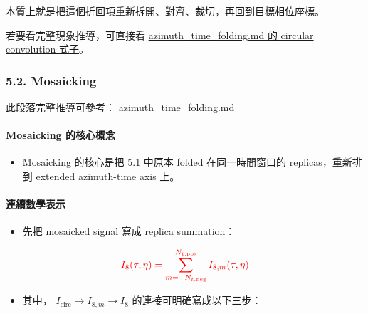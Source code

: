 \documentclass[10pt]{article}
\providecommand{\tightlist}{%
  \setlength{\itemsep}{0pt}\setlength{\parskip}{0pt}}
\begin{document}
本質上就是把這個折回項重新拆開、對齊、裁切，再回到目標相位座標。

若要看完整現象推導，可直接看
\href{./azimuth_time_folding.md\#6-circular-convolution-and-wrap-around}{azimuth\_time\_folding.md
的 circular convolution 式子}。

\hypertarget{mosaicking-1}{%
\subsubsection{5.2. Mosaicking}\label{mosaicking-1}}

此段落完整推導可參考：
\href{./azimuth_time_folding.md}{azimuth\_time\_folding.md}

\hypertarget{mosaicking-ux7684ux6838ux5fc3ux6982ux5ff5-1}{%
\paragraph{Mosaicking
的核心概念}\label{mosaicking-ux7684ux6838ux5fc3ux6982ux5ff5-1}}

\begin{itemize}
\tightlist
\item
  Mosaicking 的核心是把 5.1 中原本 folded 在同一時間窗口的
  replicas，重新排到 extended azimuth-time axis 上。
\end{itemize}

\hypertarget{ux9023ux7e8cux6578ux5b78ux8868ux793a}{%
\paragraph{連續數學表示}\label{ux9023ux7e8cux6578ux5b78ux8868ux793a}}

\begin{itemize}
\tightlist
\item
  先把 mosaicked signal 寫成 replica summation：
\end{itemize}

\begin{equation}
\begin{aligned}
{\color{red}{I_8(\tau,\eta)=\sum_{m=-N_{t,\mathrm{neg}}}^{N_{t,\mathrm{pos}}}I_{8,m}(\tau,\eta)}}
\end{aligned}
\end{equation}

\begin{itemize}
\tightlist
\item
  其中， \(I_{\mathrm{circ}} \rightarrow I_{8,m} \rightarrow I_8\)
  的連接可明確寫成以下三步：
\end{itemize}
\end{document}
